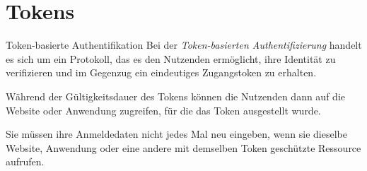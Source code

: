 \section{Tokens}

\begin{defi}{Token-basierte Authentifikation}
    Bei der \emph{Token-basierten Authentifizierung} handelt es sich um ein Protokoll, das es den Nutzenden ermöglicht, ihre Identität zu verifizieren und im Gegenzug ein eindeutiges Zugangstoken zu erhalten.

    Während der Gültigkeitsdauer des Tokens können die Nutzenden dann auf die Website oder Anwendung zugreifen, für die das Token ausgestellt wurde.

    Sie müssen ihre Anmeldedaten nicht jedes Mal neu eingeben, wenn sie dieselbe Website, Anwendung oder eine andere mit demselben Token geschützte Ressource aufrufen.
\end{defi}

